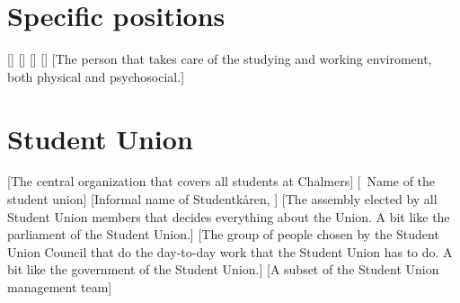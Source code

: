 \documentclass[a4paper]{dtek}
\begin{document}
\section{Specific positions}
\begin{description}
    []
    []
    []
    []
    [The person that takes care of the studying and working enviroment, both physical and psychosocial.]
\end{description}

\section{Student Union}
\begin{description}
    [The central organization that covers all students at Chalmers]
    [\formal~Name of the student union]
    [Informal name of Studentkåren, ]
    [The assembly elected by all Student Union members that decides everything about the Union. A bit like the parliament of the Student Union.]
    [The group of people chosen by the Student Union Council that do the day-to-day work that the Student Union has to do. A bit like the government of the Student Union.]
    [A subset of the Student Union management team]
\end{description}
\end{document}
